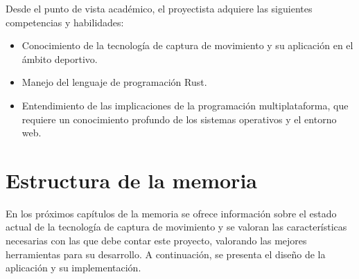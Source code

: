 Desde el punto de vista académico, el proyectista adquiere las siguientes competencias y habilidades:

\begin{itemize}
    \item Conocimiento de la tecnología de captura de movimiento y su aplicación en el ámbito deportivo.
    \item Manejo del lenguaje de programación Rust.
    \item Entendimiento de las implicaciones de la programación multiplataforma, que requiere un conocimiento profundo de los sistemas operativos y el entorno web.
\end{itemize}

\section{Estructura de la memoria}

En los próximos capítulos de la memoria se ofrece información sobre el estado actual de la tecnología de captura de movimiento y se valoran las características necesarias con las que debe contar este proyecto, valorando las mejores herramientas para su desarrollo. A continuación, se presenta el diseño de la aplicación y su implementación. 
